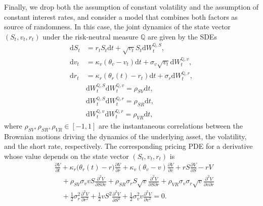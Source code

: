 \documentclass[12pt]{report} %
\theoremstyle{plain}           %
\theoremstyle{definition}      %
\theoremstyle{remark}          %
\begin{document}
Finally, we drop both the assumption of constant volatility and the
assumption of constant interest rates, and consider a model that combines
both factors as source of randomness. In this case, the joint dynamics of the state vector
\((S_t, v_t, r_t)\) under the risk-neutral measure $\mathbb{Q}$ are given by the SDEs
\begin{equation}\label{eq:sv_rates_sde}
\begin{aligned}
  \mathrm{d}S_t &= r_t S_t\mathrm{d}t
				+ \sqrt{v_t}S_t\mathrm{d}W_t^{\mathbb{Q},S},\\
  \mathrm{d}v_t &= \kappa_v(\theta_v-v_t)\mathrm{d}t
				+ \sigma_v\sqrt{v_t}\mathrm{d}W_t^{\mathbb{Q},v},\\
  \mathrm{d}r_t &= \kappa_r(\theta_{r}(t)-r_t)\mathrm{d}t
				+ \sigma_r\mathrm{d}W_t^{\mathbb{Q},r},\\
  &\mathrm{d}W_t^{\mathbb{Q},S}\mathrm{d}W_t^{\mathbb{Q},v}
				=\rho_{SV}\mathrm{d}t,\\
  &\mathrm{d}W_t^{\mathbb{Q},S}\mathrm{d}W_t^{\mathbb{Q},r}
				=\rho_{SR}\mathrm{d}t,\\
  &\mathrm{d}W_t^{\mathbb{Q},v}\mathrm{d}W_t^{\mathbb{Q},r}
				=\rho_{VR}\mathrm{d}t,
\end{aligned}
\end{equation}
where \(\rho_{SV},\rho_{SR},\rho_{VR}\in[-1,1]\) are the instantaneous correlations between the
Brownian motions driving the dynamics of the underlying asset, the volatility, and the short rate, respectively.
The corresponding pricing PDE for a derivative whose value depends on the state vector \((S_t, v_t, r_t)\) is
\begin{equation}\label{eq:sv_rates_pde}
\begin{aligned}
	&\frac{\partial V}{\partial t}
	+ \kappa_r\!\bigl(\theta_r(t)-r\bigr)\frac{\partial V}{\partial r}
	+ \kappa_v(\theta_v-v)\frac{\partial V}{\partial v}
	+ r S\frac{\partial V}{\partial S}
	- r V \\[6pt]
	&\quad
	  + \rho_{SV}\sigma_{v}v S\frac{\partial^{2} V}{\partial S\partial v}
	  + \rho_{SR}\sigma_{r}S\sqrt{v}\frac{\partial^{2} V}{\partial S\partial r}
	  + \rho_{VR}\sigma_{v}\sigma_{r}\sqrt{v}\frac{\partial^{2} V}{\partial v\partial r} \\[6pt]
	&\quad
	  + \frac12\sigma_r^{2}\frac{\partial^{2} V}{\partial r^{2}}
	  + \frac12 v S^{2}\frac{\partial^{2} V}{\partial S^{2}}
	  + \frac12\sigma_{v}^{2} v\frac{\partial^{2} V}{\partial v^{2}}
	= 0.
\end{aligned}
\end{equation}
\end{document}
